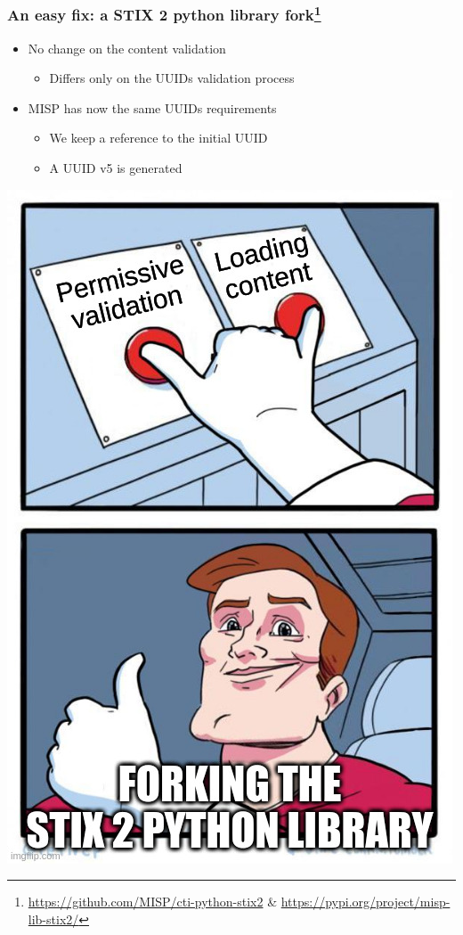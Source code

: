 \begin{frame}
    \frametitle{An easy fix: a STIX 2 python library fork\footnote{\url{https://github.com/MISP/cti-python-stix2} \& \url{https://pypi.org/project/misp-lib-stix2/}}}
    \begin{minipage}{0.62\textwidth}
        \begin{itemize}
            \item No change on the content validation
            \begin{itemize}
                \item Differs only on the UUIDs validation process
            \end{itemize}
            \item MISP has now the same UUIDs requirements
            \begin{itemize}
                \item We keep a reference to the initial UUID
                \item A UUID v5 is generated
            \end{itemize}
        \end{itemize}
    \end{minipage}%
    \begin{minipage}{0.38\textwidth}
        \includegraphics[scale=0.25]{images/two_buttons_solution.jpg}
    \end{minipage}
\end{frame}

